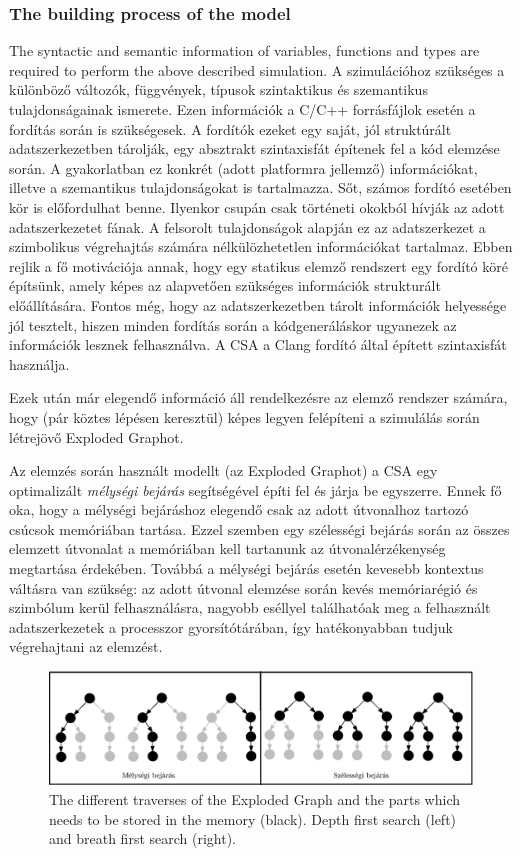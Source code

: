 \subsubsection{The building process of the model}
The syntactic and semantic information of variables, functions and types
are required to perform the above described simulation.
A szimulációhoz szükséges a különböző változók, függvények, típusok 
szintaktikus és szemantikus tulajdonságainak ismerete.
Ezen információk a C/C++ forrásfájlok esetén a fordítás során is szükségesek.
A fordítók ezeket egy saját, jól struktúrált adatszerkezetben tárolják, egy 
absztrakt szintaxisfát építenek fel a kód elemzése során.
A gyakorlatban ez konkrét (adott platformra jellemző) információkat, illetve a 
szemantikus tulajdonságokat is tartalmazza.
Sőt, számos fordító esetében kör is előfordulhat benne. Ilyenkor csupán csak 
történeti okokból hívják az adott adatszerkezetet fának.
A felsorolt tulajdonságok alapján ez az adatszerkezet a szimbolikus végrehajtás 
számára nélkülözhetetlen információkat tartalmaz. 
Ebben rejlik a fő motivációja annak, hogy egy statikus elemző rendszert egy 
fordító köré építsünk,
amely képes az alapvetően szükséges információk strukturált előállítására. 
Fontos még, hogy az adatszerkezetben
tárolt információk helyessége jól tesztelt, hiszen minden fordítás során a 
kódgeneráláskor ugyanezek az
információk lesznek felhasználva. A CSA a Clang fordító által épített 
szintaxisfát használja.

Ezek után már elegendő információ áll rendelkezésre az elemző rendszer számára,
hogy (pár köztes lépésen keresztül) képes legyen felépíteni a szimulálás során 
létrejövő Exploded Graphot.

Az elemzés során használt modellt (az Exploded Graphot) a CSA egy
optimalizált \textit{mélységi bejárás} segítségével építi fel és járja be 
egyszerre.
Ennek fő oka, hogy a mélységi bejáráshoz elegendő csak az adott útvonalhoz
tartozó csúcsok memóriában tartása. Ezzel szemben egy szélességi bejárás során
az összes elemzett útvonalat a memóriában kell tartanunk az útvonalérzékenység
megtartása érdekében. Továbbá a mélységi bejárás esetén kevesebb kontextus 
váltásra van
szükség: az adott útvonal elemzése során kevés memóriarégió és szimbólum kerül
felhasználásra, nagyobb eséllyel találhatóak meg a felhasznált adatszerkezetek a
processzor gyorsítótárában, így hatékonyabban tudjuk végrehajtani az 
elemzést.

\begin{figure}[h]
	\centering
	\includegraphics[width=1\textwidth]{img/memoria.eps}
	\caption{The different traverses of the Exploded Graph and the parts which 
	needs to be stored in the memory (black). Depth first search (left) and 
	breath first search (right).}
	\label{fig:bejaras_szemleltetes}
\end{figure}

